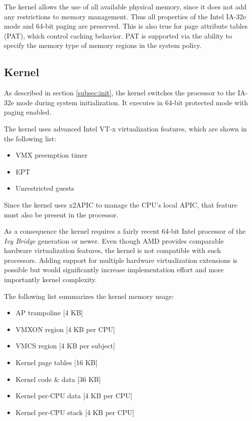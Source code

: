 The kernel allows the use of all available physical memory, since it does not
add any restrictions to memory management. Thus all properties of the Intel
IA-32e mode and 64-bit paging are preserved. This is also true for page
attribute tables (PAT), which control caching behavior. PAT is supported via the
ability to specify the memory type of memory regions in the system policy.

\subsection{Kernel}
As described in section \ref{subsec:init}, the kernel switches the processor to
the IA-32e mode during system initialization. It executes in 64-bit protected
mode with paging enabled.

The kernel uses advanced Intel VT-x virtualization features, which are shown in
the following list:

\begin{itemize}
	\item VMX preemption timer
	\item EPT
	\item Unrestricted guests
\end{itemize}

Since the kernel uses x2APIC to manage the CPU's local APIC, that feature must
also be present in the processor.

As a consequence the kernel requires a fairly recent 64-bit Intel processor of
the \emph{Ivy Bridge} generation or newer. Even though AMD provides comparable
hardware virtualization features, the kernel is not compatible with such
processors. Adding support for multiple hardware virtualization extensions is
possible but would significantly increase implementation effort and more
importantly kernel complexity.

The following list summarizes the kernel memory usage:

\begin{itemize}
	\item AP trampoline [4 KB]
	\item VMXON region [4 KB per CPU]
	\item VMCS region [4 KB per subject]
	\item Kernel page tables [16 KB]
	\item Kernel code \& data [36 KB]
	\item Kernel per-CPU data  [4 KB per CPU]
	\item Kernel per-CPU stack [4 KB per CPU]
\end{itemize}

